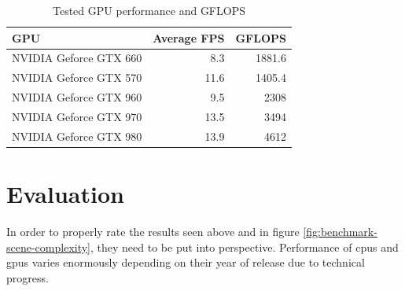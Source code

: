 \documentclass[
  twoside,
  11pt, a4paper,
  footinclude=true,
  headinclude=true,
  cleardoublepage=empty
]{scrreprt}
\begin{document}
\begin{minipage}{\textwidth}
    \begin{table}[H]
        \centering
        \begin{tabular}{l | r | r}
            GPU                     & Average FPS   & GFLOPS \\ \hline
            NVIDIA Geforce GTX 660  & 8.3           & 1881.6 \\
            NVIDIA Geforce GTX 570  & 11.6          & 1405.4 \\
            NVIDIA Geforce GTX 960  & 9.5           & 2308   \\
            NVIDIA Geforce GTX 970  & 13.5          & 3494   \\
            NVIDIA Geforce GTX 980  & 13.9          & 4612
        \end{tabular}
        \caption{Tested GPU performance and GFLOPS}
    \end{table}
\end{minipage}

\section{Evaluation}
In order to properly rate the results seen above and in figure \ref{fig:benchmark-scene-complexity},
they need to be put into perspective. Performance
of \acp{cpu} and \acp{gpu} varies enormously depending on their year of release due to technical
progress.
\end{document}
